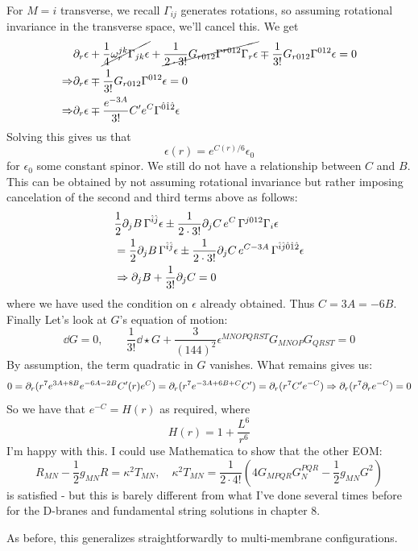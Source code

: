 \documentclass[11pt, class=article, crop=false]{standalone}
\begin{document}
\begin{enumerate}
	For $M = i$ transverse, we recall $\Gamma_{ij}$ generates rotations, so assuming rotational invariance in the transverse space, we'll cancel this. We get
	\[
	\begin{aligned}
		&\partial_r \epsilon + \cancel{\frac14 \omega_{r}^{jk} \Gamma_{jk} \epsilon} +\cancel{\frac{1}{2 \cdot 3!} G_{r012} \Gamma^{r 012} \Gamma_r \epsilon} \mp \frac{1}{3!} G_{r012} \Gamma^{012} \epsilon = 0\\
		\Rightarrow& \partial_r \epsilon \mp \frac{1}{3!} G_{r012} \Gamma^{012} \epsilon = 0\\
		\Rightarrow& \partial_r \epsilon \mp \frac{e^{-3A}}{3!} C' e^C \Gamma^{\hat 0 \hat 1 \hat 2} \epsilon
	\end{aligned}
	\]
	Solving this gives us that 
	\[
		\epsilon(r) = e^{C(r)/6} \epsilon_0
	\]
	for $\epsilon_0$ some constant spinor. We still do not have a relationship between $C$ and $B$. This can be obtained by not assuming rotational invariance but rather imposing cancelation of the second and third terms above as follows:
	\[
	\begin{aligned}
		&\frac12 \partial_j B \, \Gamma^{\hat i \hat j} \epsilon  \pm \frac{1}{2 \cdot 3!} \partial_j C \, e^{C} \, \Gamma^{j012} \Gamma_i \epsilon \\
		&= \frac12 \partial_j B \, \Gamma^{\hat i \hat j} \epsilon  \pm \frac{1}{2 \cdot 3!} \partial_j C \, e^{C-3A} \, \Gamma^{\hat i \hat j \hat 0 \hat 1 \hat 2} \epsilon\\
		& \Rightarrow  \partial_j B + \frac{1}{3!} \partial_j C = 0
	\end{aligned}
	\]
	where we have used the condition on $\epsilon$ already obtained. Thus $C = 3A = -6B$. Finally 
	Let's look at $G$'s equation of motion: 
	\[
		\dd G = 0, \qquad \frac{1}{3!} \dd \star G + \frac{3}{(144)^2} \epsilon^{MNOPQRST} G_{MNOP} G_{QRST} = 0
	\]
	By assumption, the term quadratic in $G$ vanishes. What remains gives us:
	\[
		0 = \partial_r (r^7 e^{3A+8B} e^{-6A - 2B}  C'(r) e^C) = \partial_r (r^7 e^{-3A + 6B + C} C') = \partial_r (r^7 C' e^{-C}) \Rightarrow \partial_r (r^7 \partial_r e^{-C}) = 0
	\]
	So we have that $e^{-C} = H(r)$ as required, where
	\[
		H(r) = 1 + \frac{L^6}{r^6}
	\]
	I'm happy with this. I could use Mathematica to show that the other EOM:
	\[
		R_{MN} - \frac12 g_{MN} R = \kappa^2 T_{MN}, \quad \kappa^2 T_{MN} = \frac{1}{2 \cdot 4!} \left(4 G_{M P Q R} G_{N}^{PQR} - \frac12 g_{MN} G^2\right)
	\]
	is satisfied - but this is barely different from what I've done several times before for the D-branes and fundamental string solutions in chapter 8. 
	
	As before, this generalizes straightforwardly to multi-membrane configurations. 
	

\end{enumerate}
\end{document}
